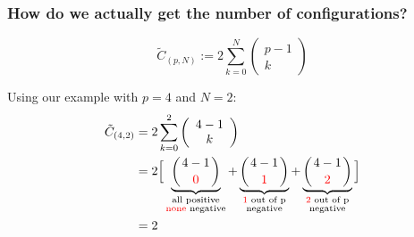 \begin{frame}\frametitle{How do we actually get the number of configurations?}

\begin{equation*}
	\tilde C_{(p,N)} := 2 \sum_{k=0}^{N} \left( \begin{array}{c}
	p-1\\
	k
	\end{array}\right)
\end{equation*}

Using our example with $p=4$ and $N=2$:
\begin{align}
	\tilde C_{(4,2)} &= 2 \sum_{k=0}^{2} \left( \begin{array}{c}
	4-1\\
	k
	\end{array}\right)\\
	&= 2 
	\Big\lbrack
	\underbrace{
	\left({4-1 \atop {\color{red}0}}\right)
	}_{\substack{\text{all positive}\\ \text{{\color{red}none} negative}}}
	+
	\underbrace{
	\left({4-1 \atop {\color{red}1}}\right)
	}_{\substack{\text{{\color{red}1} out of p}\\ \text{negative}}}
	+
	\underbrace{
	\left({4-1 \atop {\color{red}2}}\right)
	}_{\substack{\text{{\color{red}2} out of p}\\ \text{negative}}}
	\Big\rbrack\\
	&= 2
\end{align}


\end{frame}

